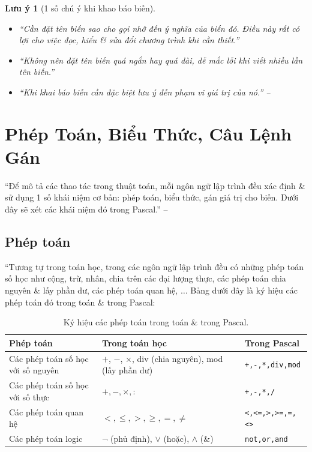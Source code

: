 \documentclass[oneside]{book}
\numberwithin{equation}{section}
\newtheorem{luuy}{Lưu ý}[section]
\begin{document}
\begin{luuy}[1 số chú ý khi khao báo biến]
	\begin{itemize}
		\item ``Cần đặt tên biến sao cho gọi nhớ đến ý nghĩa của biến đó. Điều này rất có lợi cho việc đọc, hiểu \& sửa đổi chương trình khi cần thiết.''
		\item ``Không nên đặt tên biến quá ngắn hay quá dài, dễ mắc lỗi khi viết nhiều lần tên biến.''
		\item ``Khi khai báo biến cần đặc biệt lưu ý đến phạm vi giá trị của nó.'' -- \cite[p. 23]{SGK_Tin_Hoc_11}
	\end{itemize}
\end{luuy}


\section{Phép Toán, Biểu Thức, Câu Lệnh Gán}
``Để mô tả các thao tác trong thuật toán, mỗi ngôn ngữ lập trình đều xác định \& sử dụng 1 số khái niệm cơ bản: phép toán, biểu thức, gán giá trị cho biến. Dưới đây sẽ xét các khái niệm đó trong Pascal.'' -- \cite[p. 24]{SGK_Tin_Hoc_11}

\subsection{Phép toán}
``Tương tự trong toán học, trong các ngôn ngữ lập trình đều có những phép toán số học như cộng, trừ, nhân, chia trên các đại lượng thực, các phép toán chia nguyên \& lấy phần dư, các phép toán quan hệ, $\ldots$ Bảng dưới đây là ký hiệu các phép toán đó trong toán \& trong Pascal:

\begin{table}[H]
	\centering
	\begin{tabular}{|l|l|l|}
		\hline
		\textbf{Phép toán} & \textbf{Trong toán học} & \textbf{Trong Pascal} \\
		\hline
		Các phép toán số học với số nguyên & $+$, $-$, $\times$, div (chia nguyên), mod (lấy phần dư) & \verb|+,-,*,div,mod| \\
		\hline
		Các phép toán số học với số thực & $+,-,\times,:$ & \verb|+,-,*,/| \\
		\hline
		Các phép toán quan hệ & $<,\le,>,\ge,=,\ne$ & \verb|<,<=,>,>=,=,<>| \\
		\hline
		Các phép toán logic & $\neg$ (phủ định), $\lor$ (hoặc), $\land$ (\&) & \verb|not,or,and| \\
		\hline
	\end{tabular}
	\caption{Ký hiệu các phép toán trong toán \& trong Pascal.}
\end{table}
\end{document}
